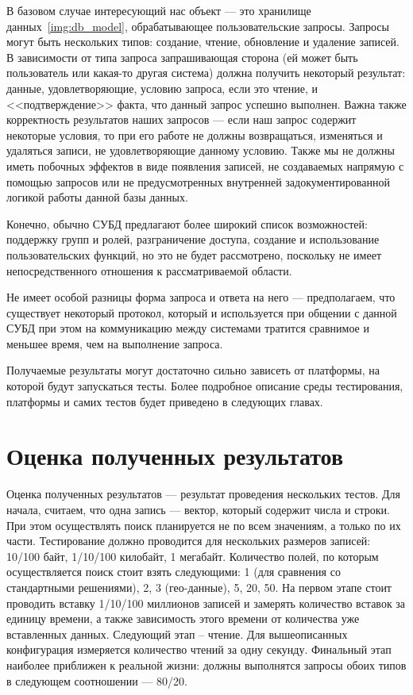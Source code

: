 В базовом случае интересующий нас объект --- это хранилище данных~\ref{img:db_model},
обрабатывающее пользовательские запросы. Запросы могут быть
нескольких типов: создание, чтение, обновление и удаление записей.
В зависимости от типа запроса запрашивающая сторона (ей может быть пользователь
или какая-то другая система) должна получить некоторый результат: данные,
удовлетворяющие, условию запроса, если это чтение, и <<подтверждение>> факта, что
данный запрос успешно выполнен.
Важна также корректность результатов наших запросов — если наш запрос
содержит некоторые условия, то при его работе не должны возвращаться,
изменяться и удаляться записи, не удовлетворяющие данному условию. Также
мы не должны иметь побочных эффектов в виде появления записей,
не создаваемых напрямую с помощью запросов или не предусмотренных внутренней
задокументированной логикой работы данной базы данных.

Конечно, обычно СУБД предлагают более широкий список возможностей:
поддержку групп и ролей, разграничение доступа, создание и использование
пользовательских функций, но это не будет рассмотрено, поскольку не имеет
непосредственного отношения к рассматриваемой области.

Не имеет особой разницы форма запроса и ответа на него ---
предполагаем, что существует некоторый протокол, который и используется при общении
с данной СУБД при этом на коммуникацию между системами
тратится сравнимое и меньшее время, чем на выполнение запроса.

Получаемые результаты могут достаточно сильно зависеть от платформы,
на которой будут запускаться тесты.
Более подробное описание среды тестирования, платформы и самих тестов
будет приведено в следующих главах.

\section{Оценка полученных результатов}

Оценка полученных результатов — результат проведения нескольких тестов.
Для начала, считаем, что одна запись — вектор, который содержит числа
и строки. При этом осуществлять поиск планируется не по всем значениям, а
только по их части. Тестирование должно проводится для нескольких размеров
записей: 10/100 байт, 1/10/100 килобайт, 1 мегабайт. Количество полей, по
которым осуществляется поиск стоит взять следующими: 1 (для сравнения со
стандартными решениями), 2, 3 (гео-данные), 5, 20, 50.
На первом этапе стоит проводить вставку 1/10/100 миллионов записей и
замерять количество вставок за единицу времени, а также зависимость этого
времени от количества уже вставленных данных.
Следующий этап – чтение. Для вышеописанных конфигурация измеряется
количество чтений за одну секунду.
Финальный этап наиболее приближен к реальной жизни: должны выполнятся
запросы обоих типов в следующем соотношении — 80/20.
